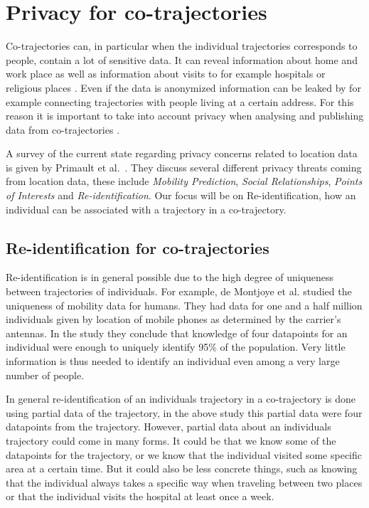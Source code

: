 \documentclass[12pt]{article}
\theoremstyle{definition}
\begin{document}
\section{Privacy for co-trajectories}
\label{sec:priv-co-traj}
Co-trajectories can, in particular when the individual trajectories
corresponds to people, contain a lot of sensitive data. It can reveal
information about home and work place as well as information about
visits to for example hospitals or religious places
\cite{gambs_show_2010}. Even if the data is anonymized information can
be leaked by for example connecting trajectories with people living at
a certain address. For this reason it is important to take into
account privacy when analysing and publishing data from
co-trajectories \cite{taylor_no_2016}.

A survey of the current state regarding privacy concerns related to
location data is given by Primault et al.~\cite{primault_long_2018}.
They discuss several different privacy threats coming from location
data, these include \emph{Mobility Prediction}, \emph{Social
  Relationships}, \emph{Points of Interests} and
\emph{Re-identification}. Our focus will be on Re-identification, how
an individual can be associated with a trajectory in a co-trajectory.

\subsection{Re-identification for co-trajectories}
\label{sec:re-identification-co}
Re-identification is in general possible due to the high degree of
uniqueness between trajectories of individuals. For example, de
Montjoye et al. \cite{de_montjoye_unique_2013} studied the uniqueness
of mobility data for humans. They had data for one and a half million
individuals given by location of mobile phones as determined by the
carrier's antennas. In the study they conclude that knowledge of four
datapoints for an individual were enough to uniquely identify 95\%
of the population. Very little information is thus needed to identify
an individual even among a very large number of people.

In general re-identification of an individuals trajectory in a
co-trajectory is done using partial data of the trajectory, in the
above study this partial data were four datapoints from the
trajectory. However, partial data about an individuals trajectory
could come in many forms. It could be that we know some of the
datapoints for the trajectory, or we know that the individual
visited some specific area at a certain time. But it could also be
less concrete things, such as knowing that the individual always takes
a specific way when traveling between two places or that the
individual visits the hospital at least once a week.
\end{document}
